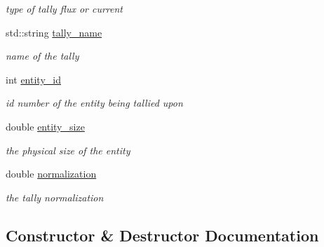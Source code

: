 \begin{DoxyCompactItemize}
\begin{DoxyCompactList}\small\item\em type of tally flux or current \end{DoxyCompactList}\item 
std\+::string \hyperlink{classpyne_1_1_tally_af5e75c809e337a06d26636020d3f1809}{tally\+\_\+name}\hypertarget{classpyne_1_1_tally_af5e75c809e337a06d26636020d3f1809}{}\label{classpyne_1_1_tally_af5e75c809e337a06d26636020d3f1809}

\begin{DoxyCompactList}\small\item\em name of the tally \end{DoxyCompactList}\item 
int \hyperlink{classpyne_1_1_tally_a84aa789b361f4323e2906a411ef3a791}{entity\+\_\+id}\hypertarget{classpyne_1_1_tally_a84aa789b361f4323e2906a411ef3a791}{}\label{classpyne_1_1_tally_a84aa789b361f4323e2906a411ef3a791}

\begin{DoxyCompactList}\small\item\em id number of the entity being tallied upon \end{DoxyCompactList}\item 
double \hyperlink{classpyne_1_1_tally_a1a19c1b79ed25ea2a3d08b15b30bbea1}{entity\+\_\+size}\hypertarget{classpyne_1_1_tally_a1a19c1b79ed25ea2a3d08b15b30bbea1}{}\label{classpyne_1_1_tally_a1a19c1b79ed25ea2a3d08b15b30bbea1}

\begin{DoxyCompactList}\small\item\em the physical size of the entity \end{DoxyCompactList}\item 
double \hyperlink{classpyne_1_1_tally_a8ff1eb44926ad1e415386983679c78f1}{normalization}\hypertarget{classpyne_1_1_tally_a8ff1eb44926ad1e415386983679c78f1}{}\label{classpyne_1_1_tally_a8ff1eb44926ad1e415386983679c78f1}

\begin{DoxyCompactList}\small\item\em the tally normalization \end{DoxyCompactList}\end{DoxyCompactItemize}


\subsection{Constructor \& Destructor Documentation}
